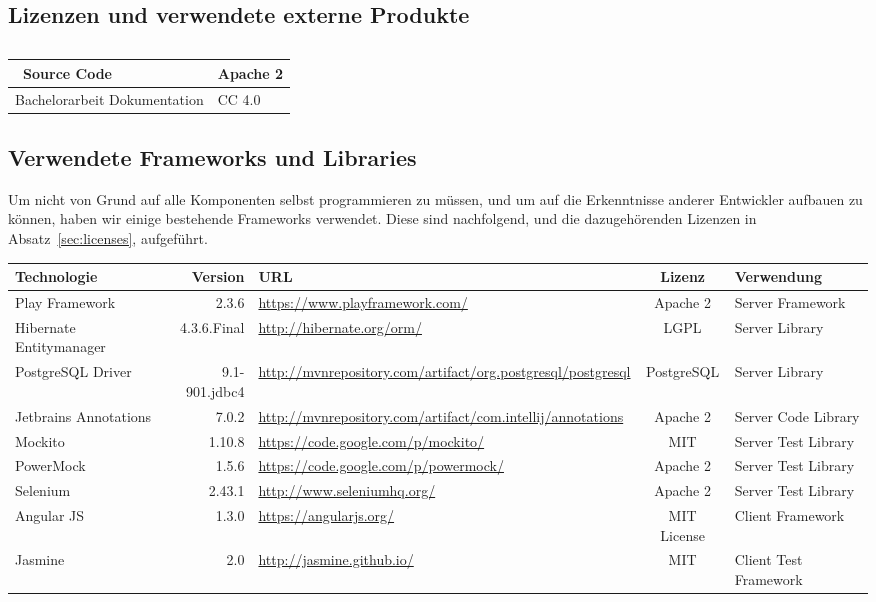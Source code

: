 \begin{landscape}
\chapter{Lizenzen und verwendete externe Produkte}
	\section{\eeppi}
	
	\begin{tabularx}{\linewidth}{|l|X|}
		\hline
		\eeppi\ Source Code & Apache 2\\
		\hline
		Bachelorarbeit Dokumentation & CC 4.0\\
		\hline
	\end{tabularx}
	

	\section{Verwendete Frameworks und Libraries}		
	Um nicht von Grund auf alle Komponenten selbst programmieren zu müssen, 
	und um auf die Erkenntnisse anderer Entwickler aufbauen zu können,
	haben wir einige bestehende Frameworks verwendet.
	Diese sind nachfolgend, und die dazugehörenden Lizenzen in Absatz\ \ref{sec:licenses}, aufgeführt.
	
	
	\vspace{0.5cm}
	
	\newcommand{\addLib}[5]{
		#1 & #2 & \url{#3} & #4 & #5 \\
		\hline
	}
	
	
	\begin{tabularx}{\linewidth}{| l r | X | c | l |}
		\hline
		\textbf{Technologie} & \textbf{Version} & \textbf{URL} & \textbf{Lizenz} & \textbf{Verwendung} \\
		\hline \hline
		\addLib{Play Framework}{2.3.6}{https://www.playframework.com/}{Apache 2}{Server Framework}
		\addLib{Hibernate Entitymanager}{4.3.6.Final}{http://hibernate.org/orm/}{LGPL}{Server Library}
		\addLib{PostgreSQL Driver}{9.1-901.jdbc4}{http://mvnrepository.com/artifact/org.postgresql/postgresql}{PostgreSQL}{Server Library}
		\addLib{Jetbrains Annotations}{7.0.2}{http://mvnrepository.com/artifact/com.intellij/annotations}{Apache 2}{Server Code Library}
		\addLib{Mockito}{1.10.8}{https://code.google.com/p/mockito/}{MIT}{Server Test Library}
		\addLib{PowerMock}{1.5.6}{https://code.google.com/p/powermock/}{Apache 2}{Server Test Library}
		\addLib{Selenium}{2.43.1}{http://www.seleniumhq.org/}{Apache 2}{Server Test Library}
		\addLib{Angular JS}{1.3.0}{https://angularjs.org/}{MIT License}{Client Framework}
		\addLib{Jasmine}{2.0}{http://jasmine.github.io/}{MIT}{Client Test Framework}
	\end{tabularx}


\end{landscape}
